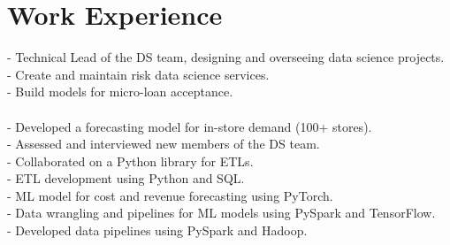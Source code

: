 \documentclass[letterpaper]{twentysecondcv} %
\begin{document}

\makeprofile %



\section{Work Experience}

\begin{twenty}
    {- Technical Lead of the DS team, designing and overseeing data science projects.\\
     - Create and maintain risk data science services.\\
     - Build models for micro-loan acceptance.}\\
    \\
    {- Developed a forecasting model for in-store demand (100+ stores).\\
     - Assessed and interviewed new members of the DS team.\\
     - Collaborated on a Python library for ETLs.}\\
    {- ETL development using Python and SQL.\\
     - ML model for cost and revenue forecasting using PyTorch.}\\
    {- Data wrangling and pipelines for ML models using PySpark and TensorFlow.}\\
    {- Developed data pipelines using PySpark and Hadoop.}\\
\end{twenty}
\end{document}
